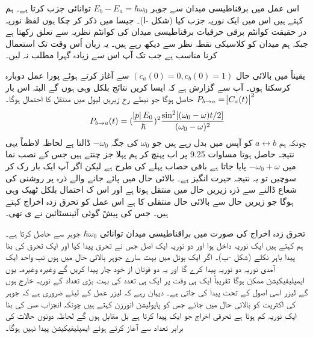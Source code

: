اس عمل میں برقناطیسی میدان سے جوہر \(E_b - E_a = \hbar\omega_0\) توانائی جزب کرتا ہے۔ ہم کہتے ہیں اس میں ایک نوریہ جزب کیا (شکل -ا)۔  جیسا میں ذکر کر چکا ہوں لفظ نوریہ در حقیقت کوانٹم برقی حرقیات برقناطیسی میدان کی کوانٹم نظریہ سے تعلق رکھتا ہے جبکہ ہم میدان کو کلاسیکی نقطہ نظر سے دیکھ رہے ہیں۔ یہ زبان اُس وقت تک استعمال کرنا مناسب ہے جب تک آپ اس سے زیادہ گہرا مطلب نہ لیں۔

یقیناً میں بالائی حال \((c_a(0)=0, c_b(0)=1)\) سے آغاز کرتے ہوئے پورا عمل دوبارہ کرسکتا ہوں۔ آپ سے گزارش ہے کہ ایسا کریں نتائج بلکل وہی ہوں گے البتہ اس بار \(P_{b\rightarrow a} = \abs{C_a(t)}^2\) حاصل ہوگا جو نیطے رخ زیریں لیول میں منتقل کا احتمال ہوگا۔
\begin{align}
	P_{b\rightarrow a} (t) = (\frac{\abs{p}E_0}{\hbar})^2 \frac{\sin^2[(\omega_0 - \omega)t/2]}{(\omega_0 - \omega)^2}
\end{align}
چونکہ ہم \(a\leftrightarrow b\) کو آپس میں بدل رہے ہیں جو \(\omega_0\) کی جگہ \(-\omega_0\) ڈالتا ہے لحاظہ لاظماً یہی نتیجہ حاصل ہوتا مساوات \num{9.25} پر اب پہنچ کر ہم پہلا جز چنتے ہیں جس کے نصب نما میں \(-\omega_0 + \omega\) پایا جاتا ہے باقی حصاب پہلے کی طرح ہے لیکن اگر آپ ایک بار رک کر سوچیں تو یہ نتیجہ حیرت انگیز ہے۔ بالائی حال میں پائے جانے والے ذرہ پر روشنی کی شعاع ڈالنے سے ذرہ زیریں حال میں منتقل ہوتا ہے اور اس ک احتمال بلکل ٹھیک وہی ہوگا جو زیریں حال سے بالائی حال منتقلی کا ہے اس عمل کو تحرق زدہ اخراج کہتے ہیں۔ جس کی پیشً گوئی آئینسٹائین نے ی تھی۔

تحرق زدہ اخراج کی صورت میں براقناطیسی میدان توانائی \(\hbar\omega_0\) جوہر سے حاصل کرتا ہے۔ ہم کہتے ہیں ایک نوریہ داخل ہوا اور دو نوریہ ایک اصل جس نے تحرق پیدا کیا اور ایک تحرق کی بنا پیدا باہر نکلے   (شکل -ب)۔ اگر ایک بوتل میں بہت سارے جوہر بالائی حال میں ہوں تب واحد ایک آمدی نوریہ دو نوریہ پیدا کرے گا اور یہ دو فوتان از خود چار پیدا کریں گے وغیرہ وغیرہ۔ یوں ایمپلیفیکیشن ممکن ہوگا تقریباً ایک ہی وقت پر ایک ہی تعدد کی بہت بڑی تعداد کے نوریہ خارج ہوں گے لیزر اسی اصول کے تحت پیدا کی جاتی ہے۔ دیہان رہے کہ لیزر عمل کے لیئے ضروری ہے کہ جوہر کی اکثریت کو بالائی حال میں جائے جس کو پاپولیشن انورزن کہتے ہیں چونکہ انجزاب ھس کی بنا ایک نوریہ کم ہوتا ہے تحرقی اخراج جو ایک پیدا کرتا ہے بل مقابل ہوں گے لحاظہ دونوں حالات کی برابر تعداد سے آغاز کرتے ہوئے ایمپلیفیکیشن پیدا نہیں ہوگا۔

